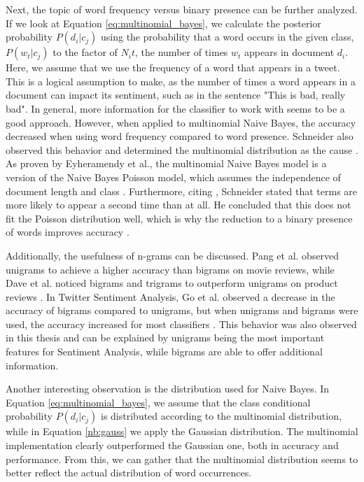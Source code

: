 Next, the topic of word frequency versus binary presence can be further analyzed. If we look at Equation \eqref{eq:multinomial_bayes}, we calculate the posterior probability $P(d_i|c_j)$ using the probability that a word occurs in the given class, $P(w_t|c_j)$ to the factor of $N_it$, the number of times $w_t$ appears in document $d_i$. Here, we assume that we use the frequency of a word that appears in a tweet. This is a logical assumption to make, as the number of times a word appears in a document can impact its sentiment, such as in the sentence "This is bad, really bad". In general, more information for the classifier to work with seems to be a good approach. However, when applied to multinomial Naive Bayes, the accuracy decreased when using word frequency compared to word presence. Schneider also observed this behavior and determined the multinomial distribution as the cause \cite{nb_freq}. As proven by Eyheramendy et al., the multinomial Naive Bayes model is a version of the Naive Bayes Poisson model, which assumes the independence of document length and class \cite{poisson}. Furthermore, citing \cite{poisson_words}, Schneider stated that terms are more likely to appear a second time than at all. He concluded that this does not fit the Poisson distribution well, which is why the reduction to a binary presence of words improves accuracy \cite{nb_freq}.

Additionally, the usefulness of n-grams can be discussed. Pang et al. observed unigrams to achieve a higher accuracy than bigrams \cite{pang-etal-2002-thumbs} on movie reviews, while Dave et al. noticed bigrams and trigrams to outperform unigrams on product reviews \cite{dave-et-al}. In Twitter Sentiment Analysis, Go et al. observed a decrease in the accuracy of bigrams compared to unigrams, but when unigrams and bigrams were used, the accuracy increased for most classifiers \cite{GoBHaHua2009}. This behavior was also observed in this thesis and can be explained by unigrams being the most important features for Sentiment Analysis, while bigrams are able to offer additional information.


Another interesting observation is the distribution used for Naive Bayes. In Equation \eqref{eq:multinomial_bayes}, we assume that the class conditional probability $P(d_i|c_j)$ is distributed according to the multinomial distribution, while in Equation \eqref{nb:gauss} we apply the Gaussian distribution. The multinomial implementation clearly outperformed the Gaussian one, both in accuracy and performance. From this, we can gather that the multinomial distribution seems to better reflect the actual distribution of word occurrences.

